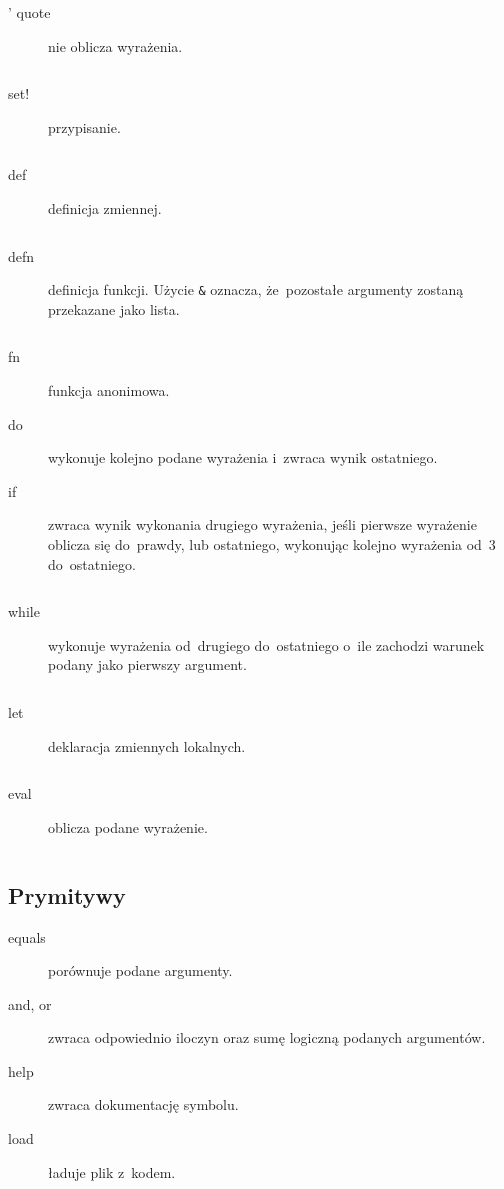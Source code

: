 \documentclass[a4paper,11pt]{article}
\newcommand{\clj}[1]{\inputminted[fontsize=\footnotesize]{clojure}{code/#1.clj}}
\begin{document}
\begin{description}
\item[' quote] nie oblicza wyrażenia.
  \clj{quote}

%
%

\item[set!] przypisanie.
  \clj{set!}

\item[def] definicja zmiennej.
  \clj{def}

\item[defn] definicja funkcji. Użycie \verb+&+ oznacza, że~pozostałe argumenty
  zostaną przekazane jako lista.
  \clj{defn}

\item[fn] funkcja anonimowa.

\item[do] wykonuje kolejno podane wyrażenia i~zwraca wynik ostatniego.

\item[if] zwraca wynik wykonania drugiego wyrażenia, jeśli pierwsze wyrażenie
  oblicza się do~prawdy, lub ostatniego, wykonując kolejno wyrażenia od~3
  do~ostatniego.
  \clj{if}

\item[while] wykonuje wyrażenia od~drugiego do~ostatniego o~ile zachodzi
  warunek podany jako pierwszy argument.
  \clj{while}

\item[let] deklaracja zmiennych lokalnych.
  \clj{let}

\item[eval] oblicza podane wyrażenie.
  \clj{eval}
\end{description}

\subsection{Prymitywy}

\begin{description}
\item[equals] porównuje podane argumenty.

\item[and, or] zwraca odpowiednio iloczyn oraz sumę logiczną podanych
  argumentów.

\item[help] zwraca dokumentację symbolu.

\item[load] ładuje plik z~kodem.
\end{description}
\end{document}
